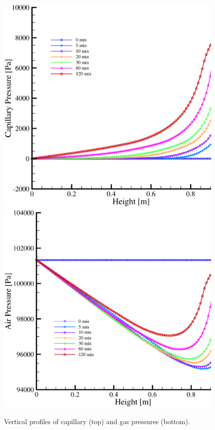 \begin{figure}[!tbh]
\begin{center}
\includegraphics[scale=0.42]{chapter_13/figures/fig_13_1_2_a}
\includegraphics[scale=0.42]{chapter_13/figures/fig_13_1_2_b}
\end{center}
\caption{Vertical profiles of capillary (top) and gas pressures (bottom).}
\label{liak:p_pc}
\end{figure}

